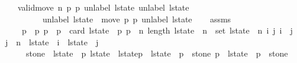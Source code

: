 \begin{isabellebody}
\ \ \ {\isachardoublequoteopen}valid{\isacharunderscore}move{\isacharprime}\ n\ p{}\ p{}\ {\isacharparenleft}unlabel\ l{\isacharunderscore}state{\isacharparenright}\ {\isacharparenleft}unlabel\ l{\isacharunderscore}state{\isacharprime}{\isacharparenright}\ {\isasymand}\ \isanewline
\ \ \ \ \ \ \ \ \ unlabel\ l{\isacharunderscore}state{\isacharprime}\ {\isacharequal}\ move\ p{}\ p{}\ {\isacharparenleft}unlabel\ l{\isacharunderscore}state{\isacharparenright}{\isachardoublequoteclose}\isanewline
%
\isadelimproof
%
\endisadelimproof
%
\isatagproof
{}\isamarkupfalse%
{\isacharminus}\isanewline
\ \ \isamarkupfalse%
\ assms\ \isamarkupfalse%
\isanewline
\ \ \ \ {\isachardoublequoteopen}p{}\ {\isacharless}\ p{}{\isachardoublequoteclose}\ {\isachardoublequoteopen}p{}\ {\isasymle}\ p{}\ {\isacharplus}\ card\ {\isacharparenleft}l{\isacharunderscore}state\ {\isacharbang}\ p{}{\isacharparenright}{\isachardoublequoteclose}\ {\isachardoublequoteopen}p{}\ {\isasymle}\ n{\isachardoublequoteclose}\ {\isachardoublequoteopen}length\ l{\isacharunderscore}state\ {\isacharequal}\ n{\isacharplus}{}{\isachardoublequoteclose}\ {\isachardoublequoteopen}{\isasymUnion}\ {\isacharparenleft}set\ l{\isacharunderscore}state{\isacharparenright}\ {\isacharequal}\ {\isacharbraceleft}{}{\isachardot}{\isachardot}{\isacharless}n{\isacharbraceright}{\isachardoublequoteclose}\ {\isachardoublequoteopen}{\isasymforall}i\ j{\isachardot}\ i\ {\isacharless}\ j\ {\isasymand}\ j\ {\isasymle}\ n\ {\isasymlongrightarrow}\ l{\isacharunderscore}state\ {\isacharbang}\ i\ {\isasyminter}\ l{\isacharunderscore}state\ {\isacharbang}\ j\ {\isacharequal}\ {\isacharbraceleft}{\isacharbraceright}{\isachardoublequoteclose}\isanewline
\ \ \ \ \ {\isachardoublequoteopen}stone\ {\isasymin}\ l{\isacharunderscore}state\ {\isacharbang}\ p{}{\isachardoublequoteclose}\ {\isachardoublequoteopen}l{\isacharunderscore}state{\isacharprime}\ {\isacharequal}\ l{\isacharunderscore}state{\isacharbrackleft}p{}\ {\isacharcolon}{\isacharequal}\ l{\isacharunderscore}state\ {\isacharbang}\ p{}\ {\isacharminus}\ {\isacharbraceleft}stone{\isacharbraceright}{\isacharcomma}\ p{}\ {\isacharcolon}{\isacharequal}\ l{\isacharunderscore}state\ {\isacharbang}\ p{}\ {\isasymunion}\ {\isacharbraceleft}stone{\isacharbraceright}{\isacharbrackright}{\isachardoublequoteclose}\isanewline

\end{isabellebody}

